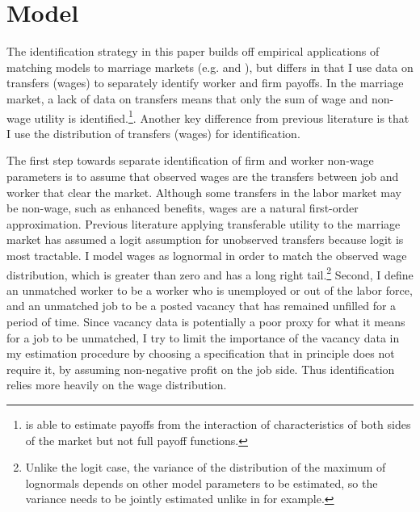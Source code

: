 \documentclass[12pt]{article}
\begin{document}
\section{Model} \label{model}

The identification strategy in this paper builds off empirical applications of matching models to marriage markets (e.g.  and ), but differs in that I use data on transfers (wages) to separately identify worker and firm payoffs. In the marriage market, a lack of data on transfers means that only the sum of wage and non-wage utility is identified.\footnote{ is able to estimate payoffs from the interaction of characteristics of both sides of the market but not full payoff functions.}. Another key difference from previous literature is that I use the distribution of transfers (wages) for identification.



The first step towards separate identification of firm and worker non-wage parameters is to assume that observed wages are the transfers between job and worker that clear the market. Although some transfers in the labor market may be non-wage, such as enhanced benefits, wages are a natural first-order approximation. Previous literature applying transferable utility to the marriage market has assumed a logit assumption for unobserved transfers because logit is most tractable. I model wages as lognormal in order to match the observed wage distribution, which is greater than zero and has a long right tail.\footnote{Unlike the logit case, the variance of the distribution of the maximum of lognormals depends on other model parameters to be estimated, so the variance needs to be jointly estimated unlike in  for example.} Second, I define an unmatched worker to be a worker who is unemployed or out of the labor force, and an unmatched job to be a posted vacancy that has remained unfilled for a period of time. Since vacancy data is potentially a poor proxy for what it means for a job to be unmatched, I try to limit the importance of the vacancy data in my estimation procedure by choosing a specification that in principle does not require it, by assuming non-negative profit on the job side. Thus identification relies more heavily on the wage distribution.
\end{document}
